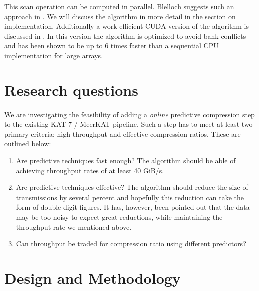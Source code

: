 \documentclass{acm_proc_article-sp}
\begin{document}
This scan operation can be computed in parallel. Blelloch suggests such an approach in \cite{blelloch1990prefix}. We will discuss the algorithm in more detail in the section on implementation.
Additionally a work-efficient CUDA version of the algorithm is discussed in \cite{harris2007parallel}. In this version the algorithm is optimized to avoid bank conflicts and has been
shown to be up to 6 times faster than a sequential CPU implementation for large arrays.
\section{Research questions}
We are investigating the feasibility of adding a \textit{online} predictive compression step to the existing KAT-7 / MeerKAT pipeline. Such a step has to meet at least two primary
criteria: high throughput and effective compression ratios. These are outlined below:
\begin{enumerate}
 \item Are predictive techniques fast enough? The algorithm should be able of achieving throughput rates of at least 40 GiB/s.
 \item Are predictive techniques effective? The algorithm should reduce the size of transmissions by several percent and hopefully
       this reduction can take the form of double digit figures. It has, however, been pointed out that the data may
       be too noisy to expect great reductions, while maintaining the throughput rate we mentioned above.
 \item Can throughput be traded for compression ratio using different predictors?
\end{enumerate}
\section{Design and Methodology}
\end{document}
